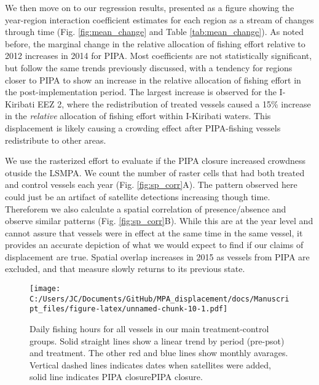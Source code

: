 \documentclass[11pt,]{article}
\begin{document}
We then move on to our regression results, presented as a figure showing
the year-region interaction coefficient estimates for each region as a
stream of changes through time (Fig. \ref{fig:mean_change} and Table
\ref{tab:mean_change}). As noted before, the marginal change in the
relative allocation of fishing effort relative to 2012 increases in 2014
for PIPA. Most coefficients are not statistically significant, but
follow the same trends previously discussed, with a tendency for regions
closer to PIPA to show an increase in the relative allocation of fishing
effort in the post-implementation period. The largest increase is
observed for the I-Kiribati EEZ 2, where the redistribution of treated
vessels caused a 15\% increase in the \emph{relative} allocation of
fishing effort within I-Kiribati waters. This displacement is likely
causing a crowding effect after PIPA-fishing vessels redistribute to
other areas.

We use the rasterized effort to evaluate if the PIPA closure increased
crowdness otuside the LSMPA. We count the number of raster cells that
had both treated and control vessels each year (Fig.
\ref{fig:sp_corr}A). The pattern observed here could just be an artifact
of satellite detections increasing though time. Thereforem we also
calculate a spatial correlation of presence/absence and observe similar
patterns (Fig. \ref{fig:sp_corr}B). While this are at the year level and
cannot assure that vessels were in effect at the same time in the same
vessel, it provides an accurate depiction of what we would expect to
find if our claims of displacement are true. Spatial overlap increases
in 2015 as vessels from PIPA are excluded, and that measure slowly
returns to its previous state.

\begin{figure}
\centering
\texttt{[image: C:/Users/JC/Documents/GitHub/MPA\_displacement/docs/Manuscript\_files/figure-latex/unnamed-chunk-10-1.pdf]}
\caption{\label{fig:unnamed-chunk-10}\label{fig:all_vessels}Daily fishing
hours for all vessels in our main treatment-control groups. Solid
straight lines show a linear trend by period (pre-psot) and treatment.
The other red and blue lines show monthly avarages. Vertical dashed
lines indicates dates when satellites were added, solid line indicates
PIPA closurePIPA closure.}
\end{figure}
\end{document}

